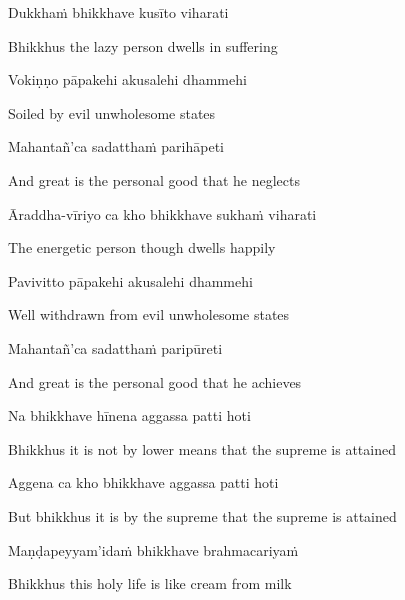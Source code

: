 Dukkhaṁ bhikkhave kusīto viharati

\begin{english}
  Bhikkhus the lazy person dwells in suffering
\end{english}

Vokiṇṇo pāpakehi akusalehi dhammehi

\begin{english}
  Soiled by evil unwholesome states
\end{english}

Mahantañ'ca sadatthaṁ parihāpeti

\begin{english}
  And great is the personal good that he neglects
\end{english}

Āraddha-vīriyo ca kho bhikkhave sukhaṁ viharati

\begin{english}
  The energetic person though dwells happily
\end{english}

Pavivitto pāpakehi akusalehi dhammehi

\begin{english}
  Well withdrawn from evil\makeatletter\hyperlink{endnote88-appendix}\makeatother
  unwholesome states
\end{english}

Mahantañ'ca sadatthaṁ paripūreti

\begin{english}
  And great is the personal good that he achieves
\end{english}

Na bhikkhave hīnena aggassa patti hoti

\begin{english}
  Bhikkhus it is not by lower means that the supreme is attained
\end{english}

Aggena ca kho bhikkhave aggassa patti hoti

\begin{english}
  But bhikkhus it is by the supreme that the supreme is attained
\end{english}

Maṇḍapeyyam'idaṁ bhikkhave brahmacariyaṁ

\begin{english}
  Bhikkhus this holy life is like cream from milk\makeatletter\hyperlink{endnote89-appendix}\makeatother
\end{english}

